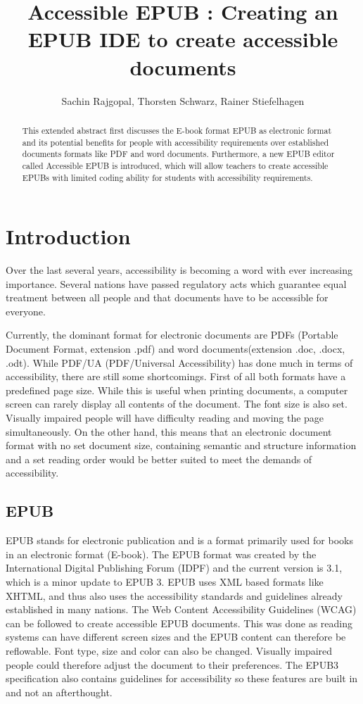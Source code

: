 \documentclass{llncs}
\title{Accessible EPUB : Creating an EPUB IDE to create accessible documents}
\author{Sachin Rajgopal\inst{1}, Thorsten Schwarz\inst{1}, Rainer Stiefelhagen\inst{1}}
\institute{Karlsruhe Institute of Technology}
\date{}
\begin{document}
\maketitle

\begin{abstract}
	This extended abstract first discusses the E-book format EPUB as electronic format and its potential benefits for people with accessibility requirements over established documents formats like PDF and word documents. Furthermore, a new EPUB editor called Accessible EPUB is introduced, which will allow teachers to create accessible EPUBs with limited coding ability for students with accessibility requirements. 
\end{abstract}

\section{Introduction}
Over the last several years, accessibility is becoming a word with ever increasing importance. Several nations have passed regulatory acts which guarantee equal treatment between all people and that documents have to be accessible for everyone.
\cite{webaim}

Currently, the dominant format for electronic documents are PDFs (Portable Document Format, extension .pdf) and word documents(extension .doc, .docx, .odt). While PDF/UA (PDF/Universal Accessibility) has done much in terms of accessibility, there are still some shortcomings. First of all both formats have a predefined page size. While this is useful when printing documents, a computer screen can rarely display all contents of the document.\cite{EPUBzone} The font size is also set. Visually impaired people will have difficulty reading and moving the page simultaneously.
On the other hand, this means that an electronic document format with no set document size, containing semantic and structure information and a set reading order would be better suited to meet the demands of accessibility.\cite{EPUBzone}

\subsection{EPUB}
EPUB stands for electronic publication and is a format primarily used for books in an electronic format (E-book). The EPUB format was created by the International Digital Publishing Forum (IDPF) and the current version is 3.1, which is a minor update to EPUB 3.\cite{EPUBspecs} EPUB uses XML based formats like XHTML, and thus also uses the accessibility standards and guidelines already established in many nations. The Web Content Accessibility Guidelines (WCAG) can be followed to create accessible EPUB documents.\cite{WCAG} This was done as reading systems can have different screen sizes and the EPUB content can therefore be reflowable. Font type, size and color can also be changed. Visually impaired people could therefore adjust the document to their preferences. The EPUB3 specification also contains guidelines for accessibility so these features are built in and not an afterthought.\cite{EPUB3bp}
\end{document}
